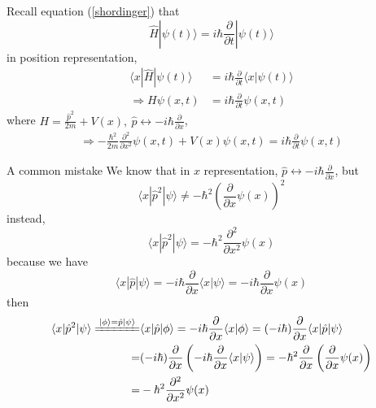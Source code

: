 \documentclass[UTF8,12pt]{article} %
\begin{document}
Recall equation (\ref{shordinger}) that
$$\hat{H}|\psi(t)\rangle = i\hbar\frac{\partial}{\partial t}|\psi(t)\rangle$$
in position representation,
\begin{align}
\langle x|\hat{H}|\psi(t)\rangle &= i\hbar\frac{\partial}{\partial t}\langle x|\psi(t)\rangle \\
\Rightarrow H\psi(x,t) &= i\hbar\frac{\partial}{\partial t}\psi(x,t)
\end{align}
where $H = \frac{\hat{p}^{2}}{2m} + V(x),~ \hat{p} \leftrightarrow -i\hbar\frac{\partial}{\partial x}$,
\begin{align}\label{sex}
\Rightarrow \boxed{-\frac{\hbar^{2}}{2m}\frac{\partial^{2}}{\partial x^{2}}\psi(x,t) + V(x)\psi(x,t) = i\hbar\frac{\partial}{\partial t}\psi(x,t)}
\end{align}

\begin{myboxes}{A common mistake}{}
We know that in $x$ representation, $\hat{p} \leftrightarrow -i\hbar\frac{\partial}{\partial x}$, but
$$\langle x|\hat{p}^{2}|\psi\rangle \ne -\hbar^{2}\left(\frac{\partial}{\partial x} \psi(x)\right)^{2}$$
instead, 
$$\boxed{\langle x|\hat{p}^{2}|\psi\rangle = -\hbar^{2}\frac{\partial^{2}}{\partial x^{2}}\psi(x)}$$
because we have
$$\langle x|\hat{p}|\psi\rangle = -i\hbar\frac{\partial}{\partial x}\langle x|\psi\rangle = -i\hbar\frac{\partial}{\partial x}\psi(x)$$
then
\begin{align*}
\langle x|\hat{p}^{2}|\psi\rangle \xlongequal{|\phi\rangle = \hat{p}|\psi\rangle}& \langle x|\hat{p}|\phi\rangle =  -i\hbar\frac{\partial}{\partial x}\langle x|\phi\rangle = (-i\hbar)\frac{\partial}{\partial x}\langle x|\hat{p}|\psi\rangle \\
=& (-i\hbar)\frac{\partial}{\partial x}\left(-i\hbar\frac{\partial}{\partial x}\langle x|\psi\rangle\right) = -\hbar^{2}\frac{\partial}{\partial x}\left(\frac{\partial}{\partial x}\psi(x)\right) \\
=& -\hbar^{2}\frac{\partial^{2}}{\partial x^{2}}\psi(x)
\end{align*}
\end{myboxes}
\end{document}
